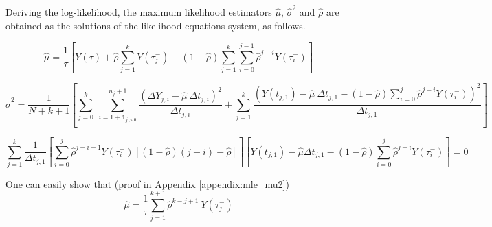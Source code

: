 \vspace{3mm}

\noindent Deriving the log-likelihood, the maximum likelihood estimators $\hat{\mu}$, $\hat{\sigma}^2$ and $\hat{\rho}$ are obtained as the solutions of the likelihood equations system, as follows.

\begin{equation}
\hat{\mu} = \frac{1}{\tau} \left[ Y(\tau)+ \hat{\rho} \sum\limits_{j=1}^{k} Y(\tau_j^-) -(1-\hat{\rho})\sum\limits_{j=1}^{k} \sum\limits_{i=0}^{j-1}\hat{\rho}^{j-i}Y(\tau_i^-)\right]
\label{eq:mle_mu2}
\end{equation}


\begin{equation}
\hat{\sigma}^2 = \frac{1}{N+k+1} \left[ \sum\limits_{j=0}^{k}\ \sum\limits_{i=1+\mathds{1}_{j>0}}^{n_j+1}\frac{\left(\Delta Y_{j,i} -\hat{\mu}\ \Delta t_{j,i}\right)^2}{\Delta t_{j,i}}+\sum\limits_{j=1}^{k} \frac{\left(Y(t_{j,1})-\hat{\mu}\ \Delta t_{j,1}-(1-\hat{\rho})\sum\limits_{i=0}^{j}\hat{\rho}^{j-i}Y(\tau_i^-)\right)^2}{\Delta t_{j,1}}\right]
\label{estimsigk1} 
\end{equation}


\begin{equation}
\sum \limits_{j=1}^k \frac{1}{\Delta t_{j,1}}\left[\sum\limits_{i=0}^{j}\hat{\rho}^{j-i-1} Y(\tau_i^-) [(1-\hat{\rho})(j-i) - \hat{\rho}] \right]  \left[Y(t_{j,1})-\hat{\mu} \Delta t_{j,1}-(1-\hat{\rho})\sum\limits_{i=0}^{j}\hat{\rho}^{j-i} Y(\tau_i^-) \right]=0 
\end{equation}

\noindent One can easily show that  (proof in Appendix \ref{appendix:mle_mu2})
\begin{equation}
\hat{\mu} = \frac{1}{\tau} \sum\limits_{j=1}^{k+1} \hat{\rho}^{k-j+1}\ Y(\tau_j^-) 
\label{estimmuk1}
\end{equation}

